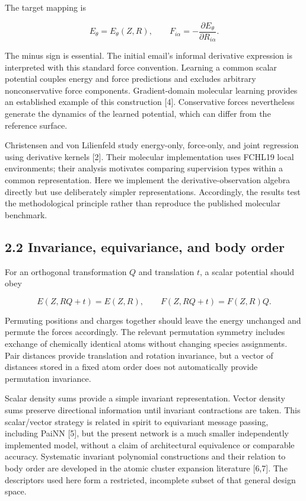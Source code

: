 \documentclass[
  11pt,
  a4paper,
]{article}
\begin{document}
The target mapping is

\[E_\theta=E_\theta(Z,R),\qquad F_{i\alpha}=-\frac{\partial E_\theta}{\partial R_{i\alpha}}.\]

The minus sign is essential. The initial email's informal derivative
expression is interpreted with this standard force convention. Learning
a common scalar potential couples energy and force predictions and
excludes arbitrary nonconservative force components. Gradient-domain
molecular learning provides an established example of this construction
{[}4{]}. Conservative forces nevertheless generate the dynamics of the
learned potential, which can differ from the reference surface.

Christensen and von Lilienfeld study energy-only, force-only, and joint
regression using derivative kernels {[}2{]}. Their molecular
implementation uses FCHL19 local environments; their analysis motivates
comparing supervision types within a common representation. Here we
implement the derivative-observation algebra directly but use
deliberately simpler representations. Accordingly, the results test the
methodological principle rather than reproduce the published molecular
benchmark.

\hypertarget{invariance-equivariance-and-body-order}{%
\subsection{2.2 Invariance, equivariance, and body
order}\label{invariance-equivariance-and-body-order}}

For an orthogonal transformation \(Q\) and translation \(t\), a scalar
potential should obey

\[E(Z,RQ+t)=E(Z,R),\qquad F(Z,RQ+t)=F(Z,R)Q.\]

Permuting positions and charges together should leave the energy
unchanged and permute the forces accordingly. The relevant permutation
symmetry includes exchange of chemically identical atoms without
changing species assignments. Pair distances provide translation and
rotation invariance, but a vector of distances stored in a fixed atom
order does not automatically provide permutation invariance.

Scalar density sums provide a simple invariant representation. Vector
density sums preserve directional information until invariant
contractions are taken. This scalar/vector strategy is related in spirit
to equivariant message passing, including PaiNN {[}5{]}, but the present
network is a much smaller independently implemented model, without a
claim of architectural equivalence or comparable accuracy. Systematic
invariant polynomial constructions and their relation to body order are
developed in the atomic cluster expansion literature {[}6,7{]}. The
descriptors used here form a restricted, incomplete subset of that
general design space.
\end{document}
